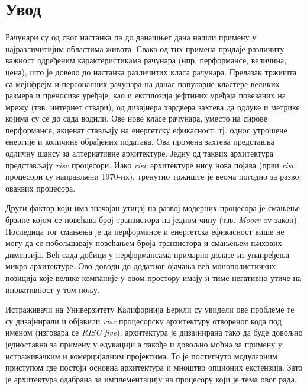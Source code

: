 \chapter{Увод}

Рачунари су од свог настанка па до данашњег дана нашли примену у најразличитијим областима живота.
Свака од тих примена придаје различиту важност одређеним карактеристикама рачунара (нпр. перформансе, величина, цена),
што је довело до настанка различитих класа рачунара. Прелазак тржишта са мејнфрејм и персоналних рачунара на данас популарне кластере великих размера и преносиве уређаје, као и експлозија јефтиних уређаја повезаних на мрежу (тзв. интернет ствари), од дизајнера хардвера захтева да одлуке и метрике којима су се до сада водили.
Ове нове класе рачунара, уместо на сирове перформансе, акценат стављају на енергетску ефикасност, тј. однос утрошене енергије и количине обрађених података.
Ова промена захтева представља одличну шансу за алтернативне архитектуре. Једну од таквих архитектура представљају \textit{\acrfull{risc}} процесори. Иако \textit{\acrshort{risc}} архитектуре нису нова појава (први \textit{\acrshort{risc}} процесори су направљени 1970-их), тренутно тржиште је веома погодно за развој оваквих процесора.

Други фактор који има значајан утицај на развој модерних процесора је смањење брзине којом се повећава број транзистора на једном чипу (тзв. \textit{Moore}-ov закон).
Последица тог смањења је да перформансе и енергетска ефикасност више не могу да се побољшавају повећањем броја транзистора и смањењем њихових димензија. Већ сада добици у перформансама примарно долазе из унапређења микро-архитектуре. Ово доводи до додатног ојачања већ монополистичких позиција које велике компаније у овом простору имају и тиме негативно утиче на иновативност у том пољу.

Истраживачи на Универзитету Калифорнија Беркли су увидели ове проблеме те су дизајнирали и објавили \textit{\acrshort{risc}} процесорску архитектуру отвореног кода под именом \cite{riscv} (изговара се \textit{RISC five}).  архитектура је дизајнирана тако да буде довољно једноставна за примену у едукацији а такође и довољно моћна за примену у истраживачким\cite{rocket} и комерцијалним\cite{sifive}\cite{tenstorrent} пројектима. То је постигнуто модуларним приступом где постоји основна архитектура и мноштво опционих екстензија. Зато је  архитектура одабрана за имплементацију на процесору који је тема овог рада.

